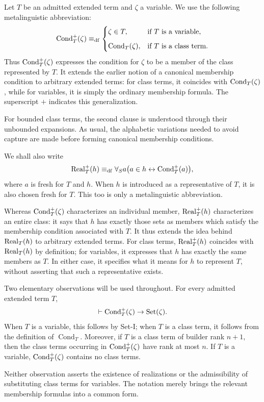 Let \(T\) be an admitted extended term and \(\zeta\) a variable. We use
the following metalinguistic abbreviation:
\[
\operatorname{Cond}_T^{+}(\zeta)
\mathrel{\equiv_{\mathrm{df}}}
\begin{cases}
\zeta\in T, & \text{if \(T\) is a variable},\\[2mm]
\operatorname{Cond}_T(\zeta), & \text{if \(T\) is a class term}.
\end{cases}
\]
Thus \(\operatorname{Cond}_T^{+}(\zeta)\) expresses the condition for
\(\zeta\) to be a member of the class represented by \(T\).
It extends the earlier notion of a canonical membership condition
to arbitrary extended terms: for class terms, it coincides with
\(\operatorname{Cond}_T(\zeta)\), while for variables, it is simply the
ordinary membership formula. The superscript \(+\) indicates
this generalization.

For bounded class terms, the second clause is understood through their
unbounded expansions. As usual, the alphabetic variations needed to
avoid capture are made before forming canonical membership conditions.

We shall also write
\[
\operatorname{Real}^+_T(h)
\mathrel{\equiv_{\mathrm{df}}}
\forall_S a\bigl(a\in h\leftrightarrow \operatorname{Cond}_T^{+}(a)\bigr),
\]
where \(a\) is fresh for \(T\) and \(h\). When \(h\) is introduced
as a representative of \(T\), it is also chosen fresh for \(T\).
This too is only a metalinguistic abbreviation.

Whereas \(\operatorname{Cond}_T^{+}(\zeta)\) characterizes an individual
member, \(\operatorname{Real}_T^{+}(h)\) characterizes an entire class:
it says that \(h\) has exactly those sets as members which
satisfy the membership condition associated with \(T\).
It thus extends the idea behind \(\operatorname{Real}_T(h)\) to arbitrary
extended terms. For class terms, \(\operatorname{Real}_T^+(h)\) coincides
with \(\operatorname{Real}_T(h)\) by definition; for variables, it expresses
that \(h\) has exactly the same members as \(T\). In either case,
it specifies what it means for \(h\) to represent \(T\), without
asserting that such a representative exists.

Two elementary observations will be used throughout. For every
admitted extended term \(T\),
\[
\vdash \operatorname{Cond}_T^{+}(\zeta)\to\operatorname{Set}(\zeta).
\]
When \(T\) is a variable, this follows by Set-I; when \(T\) is a
class term, it follows from the definition of
\(\operatorname{Cond}_T\). Moreover, if \(T\) is a class term of
builder rank \(n+1\), then the class terms occurring in
\(\operatorname{Cond}_T^{+}(\zeta)\) have rank at most \(n\). If \(T\) is a variable,
\(\operatorname{Cond}_T^{+}(\zeta)\) contains no class terms.

Neither observation asserts the existence of realizations or the
admissibility of substituting class terms for variables. The notation
merely brings the relevant membership formulas into a common form.

